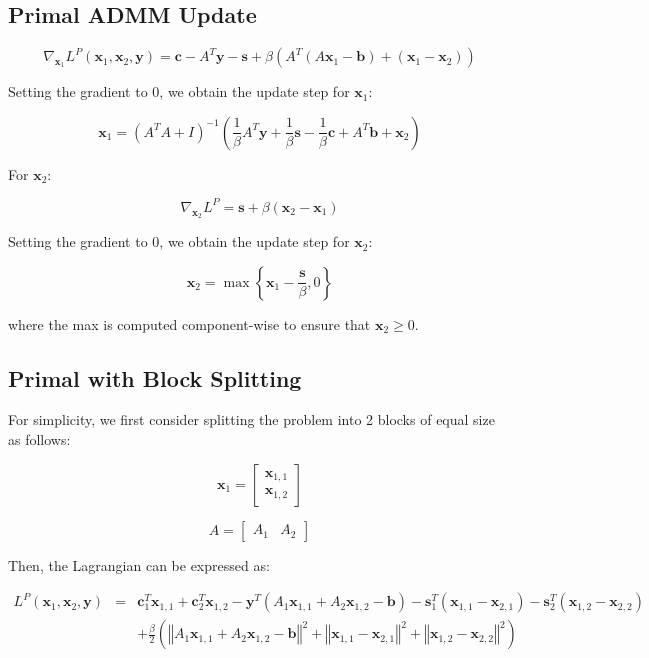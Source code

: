 \documentclass{article}
\begin{document}
\subsection*{Primal ADMM Update}

\[
\nabla_{\mathbf{x}_{1}}L^{P}(\mathbf{x}_{1},\mathbf{x}_{2},\mathbf{y})=\mathbf{c}-A^{T}\mathbf{y}-\mathbf{s}+\beta\left(A^{T}\left(A\mathbf{x}_{1}-\mathbf{b}\right)+\left(\mathbf{x}_{1}-\mathbf{x}_{2}\right)\right)
\]


Setting the gradient to $0$, we obtain the update step for $\mathbf{x}_{1}$:

\[
\mathbf{x}_{1}=\left(A^{T}A+I\right)^{-1}\left(\frac{1}{\beta}A^{T}\mathbf{y}+\frac{1}{\beta}\mathbf{s}-\frac{1}{\beta}\mathbf{c}+A^{T}\mathbf{b}+\mathbf{x}_{2}\right)
\]


For $\mathbf{x}_{2}$:

\[
\nabla_{\mathbf{x}_{2}}L^{P}=\mathbf{s}+\beta\left(\mathbf{x}_{2}-\mathbf{x}_{1}\right)
\]


Setting the gradient to $0$, we obtain the update step for $\mathbf{x}_{2}$:

\[
\mathbf{x}_{2}=\max\left\{ \mathbf{x}_{1}-\frac{\mathbf{s}}{\beta},0\right\} 
\]


where the max is computed component-wise to ensure that $\mathbf{x}_{2}\geq0$.


\subsection*{Primal with Block Splitting}

For simplicity, we first consider splitting the problem into 2 blocks
of equal size as follows:

\[
\mathbf{x}_{1}=\begin{bmatrix}\mathbf{x}_{1,1}\\
\mathbf{x}_{1,2}
\end{bmatrix}
\]


\[
A=\begin{bmatrix}A_{1} & A_{2}\end{bmatrix}
\]


Then, the Lagrangian can be expressed as:

\begin{eqnarray*}
L^{P}(\mathbf{x}_{1},\mathbf{x}_{2},\mathbf{y}) & = & \mathbf{c}_{1}^{T}\mathbf{x}_{1,1}+\mathbf{c}_{2}^{T}\mathbf{x}_{1,2}-\mathbf{y}^{T}\left(A_{1}\mathbf{x}_{1,1}+A_{2}\mathbf{x}_{1,2}-\mathbf{b}\right)-\mathbf{s}_{1}^{T}\left(\mathbf{x}_{1,1}-\mathbf{x}_{2,1}\right)-\mathbf{s}_{2}^{T}\left(\mathbf{x}_{1,2}-\mathbf{x}_{2,2}\right)\\
 &  & +\frac{\beta}{2}\left(\left\Vert A_{1}\mathbf{x}_{1,1}+A_{2}\mathbf{x}_{1,2}-\mathbf{b}\right\Vert ^{2}+\left\Vert \mathbf{x}_{1,1}-\mathbf{x}_{2,1}\right\Vert ^{2}+\left\Vert \mathbf{x}_{1,2}-\mathbf{x}_{2,2}\right\Vert ^{2}\right)
\end{eqnarray*}
\end{document}
